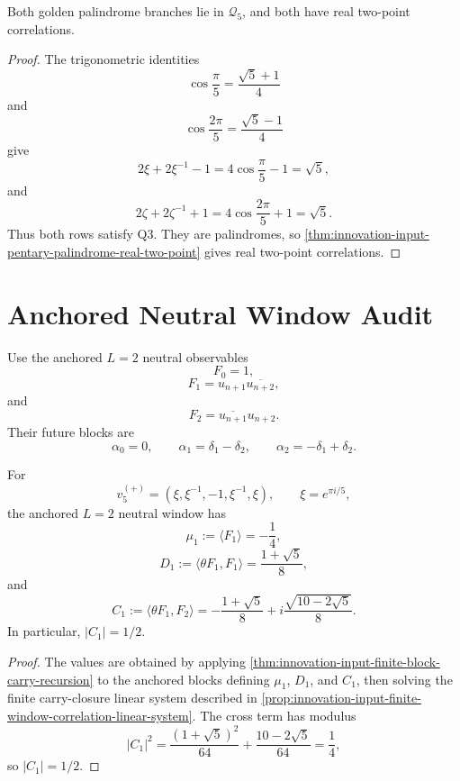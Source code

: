 \begin{theorem}
\label{thm:innovation-input-golden-palindrome-qthree-rows}
Both golden palindrome branches lie in $\mathcal Q_5$, and both have real
two-point correlations.
\end{theorem}

\begin{proof}
The trigonometric identities
$$
\cos\frac{\pi}{5}=\frac{\sqrt5+1}{4}
$$
and
$$
\cos\frac{2\pi}{5}=\frac{\sqrt5-1}{4}
$$
give
$$
2\xi+2\xi^{-1}-1
=
4\cos\frac{\pi}{5}-1
=
\sqrt5,
$$
and
$$
2\zeta+2\zeta^{-1}+1
=
4\cos\frac{2\pi}{5}+1
=
\sqrt5.
$$
Thus both rows satisfy Q3. They are palindromes, so
\autoref{thm:innovation-input-pentary-palindrome-real-two-point} gives
real two-point correlations.
\end{proof}

\section{Anchored Neutral Window Audit}
\label{sec:innovation-input-golden-palindrome-anchored-audit}

\begin{definition}
\label{def:innovation-input-pentary-anchored-neutral-window}
Use the anchored $L=2$ neutral observables
$$
F_0=1,
$$
$$
F_1=u_{n+1}\overline{u_{n+2}},
$$
and
$$
F_2=\overline{u_{n+1}}u_{n+2}.
$$
Their future blocks are
$$
\alpha_0=0,
\qquad
\alpha_1=\delta_1-\delta_2,
\qquad
\alpha_2=-\delta_1+\delta_2.
$$
\end{definition}

\begin{lemma}
\label{lem:innovation-input-first-golden-branch-window-values}
For
$$
v_5^{(+)}=(\xi,\xi^{-1},-1,\xi^{-1},\xi),
\qquad
\xi=e^{\pi i/5},
$$
the anchored $L=2$ neutral window has
$$
\mu_1:=\langle F_1\rangle=-\frac14,
$$
$$
D_1:=\langle\theta F_1,F_1\rangle=\frac{1+\sqrt5}{8},
$$
and
$$
C_1:=\langle\theta F_1,F_2\rangle
=
-\frac{1+\sqrt5}{8}
+
i\frac{\sqrt{10-2\sqrt5}}{8}.
$$
In particular, $|C_1|=1/2$.
\end{lemma}

\begin{proof}
The values are obtained by applying
\autoref{thm:innovation-input-finite-block-carry-recursion} to the anchored
blocks defining $\mu_1$, $D_1$, and $C_1$, then solving the finite
carry-closure linear system described in
\autoref{prop:innovation-input-finite-window-correlation-linear-system}.
The cross term has modulus
$$
|C_1|^2
=
\frac{(1+\sqrt5)^2}{64}
+
\frac{10-2\sqrt5}{64}
=
\frac14,
$$
so $|C_1|=1/2$.
\end{proof}

